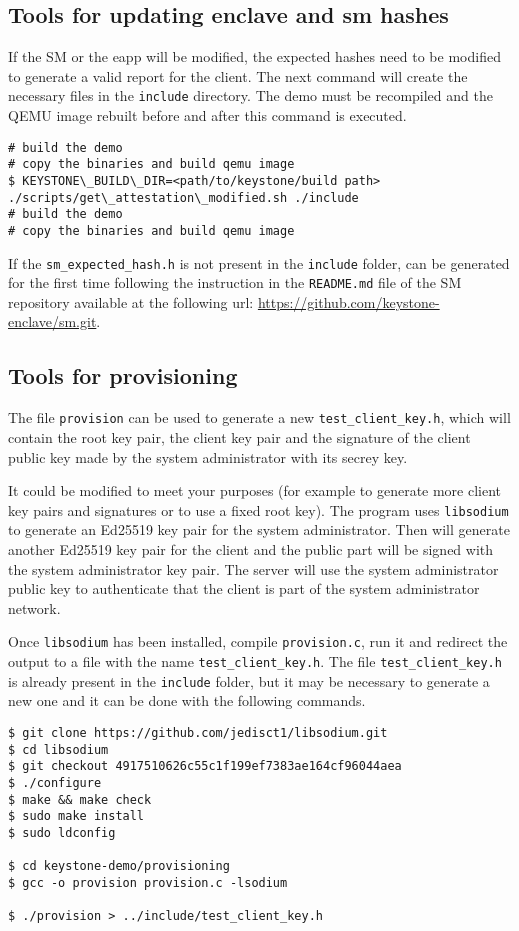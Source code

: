 \subsection{Tools for updating enclave and sm hashes}
If the SM or the eapp will be modified, the expected hashes need to be modified to generate a valid report for the client. The next command will create the necessary files in the \texttt{include} directory. The demo must be recompiled and the QEMU image rebuilt before and after this command is executed. \\

\begin{lstlisting}[frame=single]
# build the demo
# copy the binaries and build qemu image
$ KEYSTONE\_BUILD\_DIR=<path/to/keystone/build path> ./scripts/get\_attestation\_modified.sh ./include
# build the demo
# copy the binaries and build qemu image
\end{lstlisting}

If the \texttt{sm\_expected\_hash.h} is not present in the \texttt{include} folder, can be generated for the first time following the instruction in the \texttt{README.md} file of the SM repository available at the following url: \url{https://github.com/keystone-enclave/sm.git}. 

\subsection{Tools for provisioning}

The file \texttt{provision} can be used to generate a new \texttt{test\_client\_key.h}, which will contain the root key pair, the client key pair and the signature of the client public key made by the system administrator with its secrey key. 

It could be modified to meet your purposes (for example to generate more client key pairs and signatures or to use a fixed root key).
The program uses \texttt{libsodium} to generate an Ed25519 key pair for the system administrator. Then will generate another Ed25519 key pair for the client and the public part will be signed with the system administrator key pair. The server will use the system administrator public key to authenticate that the client is part of the system administrator network.
 
Once \texttt{libsodium}  has been installed, compile \texttt{provision.c}, run it and redirect the output to a file with the name \texttt{test\_client\_key.h}. 
The file \texttt{test\_client\_key.h} is already present in the \texttt{include} folder, but it may be necessary to generate a new one and it can be done with the following commands. \\

\begin{lstlisting}[frame=single]
$ git clone https://github.com/jedisct1/libsodium.git
$ cd libsodium
$ git checkout 4917510626c55c1f199ef7383ae164cf96044aea
$ ./configure
$ make && make check
$ sudo make install
$ sudo ldconfig

$ cd keystone-demo/provisioning
$ gcc -o provision provision.c -lsodium

$ ./provision > ../include/test_client_key.h
\end{lstlisting}